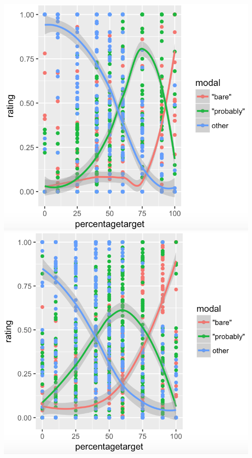 \documentclass{sp}          %
\begin{document}
\begin{center}
\includegraphics[scale=0.5]{Condition-2-trials.png}
\includegraphics[scale=0.45]{Condition-3-trials.png}

\vspace{2em}
\end{center}
\end{document}
